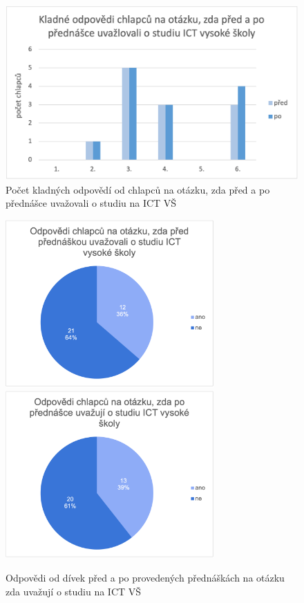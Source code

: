 \documentclass[12pt]{report}			%
\begin{document}
                \begin{figure}
                    \centering
                    \includegraphics[width=16cm]{Maturitni Prace/images/chlapci_uvazovani.png} 
                    \caption{Počet kladných odpovědí od chlapců na otázku, zda před a po přednášce uvažovali o studiu na ICT VŠ}
                    \label{fig:chlapci_uvazovani}
                \end{figure}
                \begin{figure}
                    \centering
                    \includegraphics[width=8cm]{Maturitni Prace/images/chlapci_pred.png} 
                    \includegraphics[width=8cm]{Maturitni Prace/images/chlapci_po.png} 
                    \caption{Odpovědi od dívek před a po provedených přednáškách na otázku zda uvažují o studiu na ICT VŠ}
                    \label{fig:chlapci}
                \end{figure}
                
\end{document}
